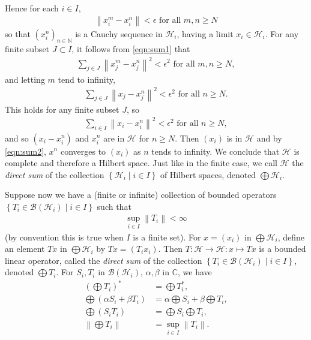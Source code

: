 \documentclass[11pt,a4paper]{report}
\theoremstyle{plain}
\theoremstyle{definition}
\newcommand{\1}{\mathbbm{1}}
\newcommand{\C}{\mathbb{C}}
\newcommand{\N}{\mathbb{N}}
\renewcommand{\H}{\mathcal{H}}
\newcommand{\B}{\mathcal{B}}
\renewcommand{\oplus}{\textstyle\bigoplus}
\begin{document}
Hence for each $i\in I$,
\begin{align*}
	\left\|x^m_i-x^n_i\right\| < \epsilon \mbox{ for all } m,n\geq N
\end{align*}
so that $(x^n_i)_{n\in\N}$ is a Cauchy sequence in $\H_i$, having a limit $x_i\in\H_i$.
For any finite subset $J\subset I$, it follows from \eqref{eqn:sum1} that 
\begin{align*}
	\sum_{j\in J}{\left\|x^m_j-x^n_j\right\|^2} < \epsilon^2  \mbox{ for all } m,n\geq N,
\end{align*}
and letting $m$ tend to infinity,
\begin{align}\label{eqn:sum2}
	\sum_{j\in J}{\left\|x_j-x^n_j\right\|^2} < \epsilon^2  \mbox{ for all } n\geq N.
\end{align}
This holds for any finite subset $J$, so
\begin{align*}
	\sum_{i\in I}{\left\|x_i-x^n_i\right\|^2} < \epsilon^2  \mbox{ for all } n\geq N,
\end{align*}
and so $(x_i-x^n_i)$ and $x^n_i$ are in $\H$ for $n\geq N$. Then $(x_i)$ is in $\H$ and by \eqref{eqn:sum2}, $x^n$ converges to $(x_i)$ as $n$ tends to infinity. We conclude that $\H$ is complete and therefore a Hilbert space. Just like in the finite case, we call $\H$ the \emph{direct sum} of the collection $\left\{\H_i \mid i\in I\right\}$ of Hilbert spaces, denoted $\oplus\H_i$.

Suppose now we have a (finite or infinite) collection of bounded operators $\left\{T_i\in\B{(\H_i)} \mid i\in I\right\}$ such that 
\begin{align*}
	\sup_{i\in I} {\left\|T_i\right\|} < \infty
\end{align*} 
(by convention this is true when $I$ is a finite set).
For $x=(x_i)$ in $\oplus\H_i$, define an element $Tx$ in $\oplus\H_i$ by $Tx=(T_ix_i)$. Then $T:\H\to\H:x\mapsto Tx$ is a bounded linear operator, called the \emph{direct sum} of the collection $\left\{T_i\in\B{(\H_i)} \mid i \in I\right\}$, denoted $\oplus T_i$. For $S_i,T_i$ in $\B(\H_i)$, $\alpha,\beta$ in $\C$, we have 
\begin{align*}
		\left(\oplus T_i\right)^\ast &= \oplus T_i^\ast,					\\
		\oplus (\alpha S_i+\beta T_i) &= 
					\alpha \oplus S_i + \beta \oplus T_i, 					\\
		\oplus (S_i T_i) &= \oplus S_i \oplus T_i,							\\
		\left\|\oplus T_i\right\| &= \sup_{i\in I} {\left\|T_i\right\|}.				\\
\end{align*}
\end{document}

